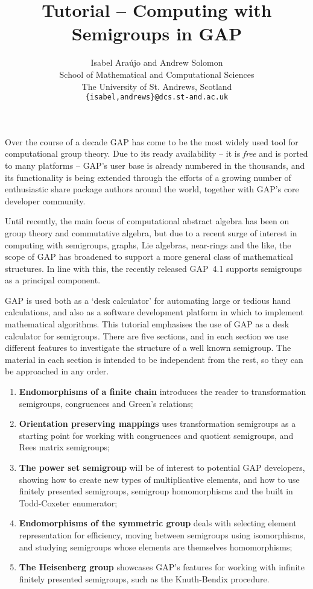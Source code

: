 \documentclass[12pt]{article}
\title{Tutorial -- Computing with Semigroups in GAP}
\author{Isabel Ara\'ujo and Andrew Solomon\\
School of Mathematical and Computational Sciences\\
The University of St. Andrews, Scotland\\
{\small \tt \{isabel,andrews\}@dcs.st-and.ac.uk}}
\date{}
\theoremstyle{plain} \newtheorem{Thm}{Theorem}
\theoremstyle{plain} \newtheorem{Cor}{Corollary}
\theoremstyle{plain} \newtheorem{Lemma}{Lemma}
\theoremstyle{plain} \newtheorem{Prop}{Proposition}
\theoremstyle{plain} \newtheorem{Ex}{Exercise}
\def\gap{\sf GAP}
\begin{document}
\maketitle


Over the course of a decade {\gap} has come to be the most widely used tool
for computational group theory. Due to its ready availability --
it is {\em free} and is ported to many platforms -- {\gap}'s
user base is already numbered in the thousands, and its functionality
is being extended through the efforts of a growing number of 
enthusiastic share package authors around the world, together
with {\gap}'s core developer community. 

Until recently, the main
focus of computational abstract algebra has been on group theory and 
commutative algebra, but due to a recent surge of interest in computing with
semigroups, graphs, Lie algebras, near-rings and the like, the 
scope of {\gap} has broadened to support a more general class of 
mathematical structures.
In line with this, the recently  released 
{\gap}~4.1 supports semigroups as a principal component. 

{\gap} is used both as a `desk calculator' for automating
large or tedious hand calculations, and also 
as a software development platform in which to implement
mathematical algorithms.  This tutorial emphasises the use of 
{\gap} as a desk calculator
for semigroups. There are five sections,  and in each section
we use different features to investigate the structure of 
a well known semigroup. The material in each section is intended
to be independent from the rest, so they can be approached in any
order.
\begin{enumerate}
\item {\bf Endomorphisms of a finite chain} introduces the reader to
transformation semigroups, congruences and Green's relations;
\item {\bf Orientation preserving mappings} uses transformation semigroups
as a starting point for working with congruences and quotient semigroups,
and Rees matrix semigroups;
\item {\bf The power set semigroup} will be of interest to potential 
{\gap} developers, showing how to create new types of multiplicative elements,
and how to use finitely presented semigroups, semigroup homomorphisms and
the built in Todd-Coxeter enumerator;
\item {\bf Endomorphisms of the symmetric group} deals with 
selecting element representation for efficiency,
moving between semigroups using isomorphisms, 
and studying semigroups whose elements are themselves homomorphisms;
\item {\bf The Heisenberg group} showcases {\gap}'s features for working
with infinite finitely presented semigroups, such as the Knuth-Bendix 
procedure.
\end{enumerate}
\end{document}
